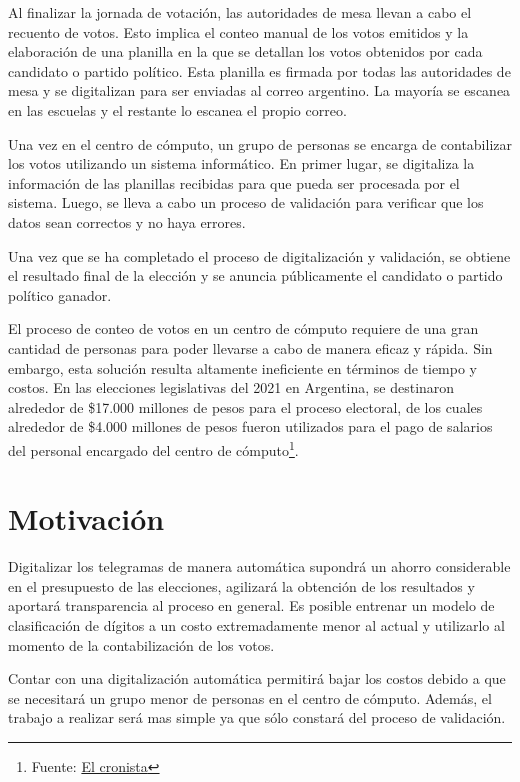 Al finalizar la jornada de votación, las autoridades de mesa llevan a cabo el recuento de votos. Esto implica el conteo
manual de los votos emitidos y la elaboración de una planilla en la que se detallan los votos obtenidos por cada
candidato o partido político. Esta planilla es firmada por todas las autoridades de mesa y se digitalizan para ser
enviadas al correo argentino. La mayoría se escanea en las escuelas y el restante lo escanea el propio correo.

Una vez en el centro de cómputo, un grupo de personas se encarga de contabilizar los votos utilizando un sistema
informático. En primer lugar, se digitaliza la información de las planillas recibidas para que pueda ser procesada por
el sistema. Luego, se lleva a cabo un proceso de validación para verificar que los datos sean correctos y no haya
errores.

Una vez que se ha completado el proceso de digitalización y validación, se obtiene el resultado final de la elección y
se anuncia públicamente el candidato o partido político ganador.

El proceso de conteo de votos en un centro de cómputo requiere de una gran cantidad de personas para poder llevarse a
cabo de manera eficaz y rápida. Sin embargo, esta solución resulta altamente ineficiente en términos de tiempo y
costos. En las elecciones legislativas del 2021 en Argentina, se destinaron alrededor de \$17.000 millones de pesos
para el proceso electoral, de los cuales alrededor de \$4.000 millones de pesos fueron utilizados para el pago de
salarios del personal encargado del centro de cómputo\footnote{Fuente:
    \href{https://www.cronista.com/economia-politica/Elecciones-legislativas-2021-cuanto-mas-se-gastara-por-el-coronavirus-segun-el-Presupuesto-20201004-0006.html}{El
        cronista}}.

\section{Motivación}

Digitalizar los telegramas de manera automática supondrá un ahorro considerable en el presupuesto de las elecciones,
agilizará la obtención de los resultados y aportará transparencia al proceso en general. Es posible entrenar un modelo
de clasificación de dígitos a un costo extremadamente menor al actual y utilizarlo al momento de la contabilización de
los votos.

Contar con una digitalización automática permitirá bajar los costos debido a que se necesitará un grupo menor de
personas en el centro de cómputo. Además, el trabajo a realizar será mas simple ya que sólo constará del proceso de
validación.

